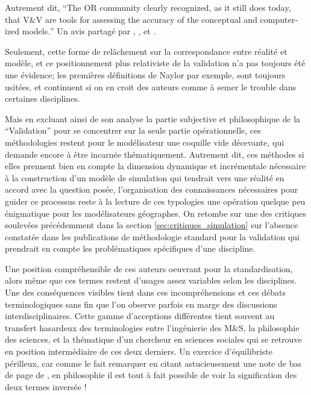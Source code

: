 Autrement dit, \foreignquote{english}{The OR community clearly recognized, as it still does today, that V\&V are tools for assessing the accuracy of the conceptual and computerized models.} Un avis partagé par \textcite{Kleijnen1995}  , \textcite{Balci1998}, et \textcite{Sargent2010} .

Seulement, cette forme de relâchement sur la correspondance entre réalité et modèle, et ce positionnement plus relativiste de la validation n'a pas toujours été une évidence; les premières définitions de Naylor par exemple, sont toujours usitées, et continuent si on en croit des auteurs comme \textcite{Kleindorfer1998} à semer le trouble dans certaines disciplines.

Mais en excluant ainsi de son analyse la partie subjective et philosophique de la \enquote{Validation}  pour se concentrer sur la seule partie opérationnelle, ces méthodologies restent pour le modélisateur une coquille vide décevante, qui demande encore à être incarnée thématiquement. Autrement dit, ces méthodes si elles prennent bien en compte la dimension dynamique et incrémentale nécessaire à la construction d'un modèle de simulation qui tendrait vers une réalité en accord avec la question posée, l'organisation des connaissances nécessaires pour guider ce processus reste à la lecture de ces typologies une opération quelque peu énigmatique pour les modélisateurs géographes. On retombe sur une des critiques soulevées précédemment dans la section \ref{sec:critiques_simulation} sur l'absence constatée dans les publications de méthodologie standard pour la validation qui prendrait en compte les problématiques spécifiques d'une discipline.

Une position compréhensible de ces auteurs oeuvrant pour la standardisation, alors même que ces termes restent d'usages assez variables selon les disciplines. Une des conséquences visibles tient dans ces incompréhensions et ces débats terminologiques sans fin \autocites{David2009, Augusiak2014} que l'on observe parfois en marge des discussions interdisciplinaires. Cette gamme d'acceptions différentes tient souvent au transfert hasardeux des terminologies entre l'ingénierie des M\&S, la philosophie des sciences, et la thématique d'un chercheur en sciences sociales qui se retrouve en position intermédiaire de ces deux derniers. Un exercice d'équilibriste périlleux, car comme le fait remarquer \textcite{Kleijnen1995} en citant astucieusement une note de bas de page de \textcite{Barlas1990}, en philosophie il est tout à fait possible de voir la signification des deux termes inversée ! 

